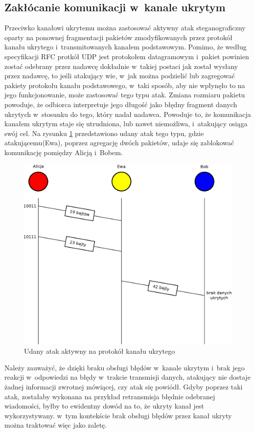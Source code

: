 \documentclass[a4paper, twoside, 12pt]{report}
\begin{document}
       \subsection{Zakłócanie komunikacji w~kanale ukrytym}
       Przeciwko kanałowi ukrytemu można zastosować aktywny atak steganograficzny
       oparty na ponownej fragmentacji pakietów zmodyfikowanych przez protokół
       kanału ukrytego i~transmitowanych kanałem podstawowym. Pomimo, że według
       specyfikacji RFC protkół UDP jest protokołem datagramowym i~pakiet powinien
       zostać odebrany przez nadawcę dokładnie w~takiej postaci jak został wysłany przez
       nadawcę, to jeśli atakujący wie, w~jak można podzielić lub zagregować
       pakiety protokołu kanału podstawowego, w~taki sposób, aby nie wpłynęło to na
       jego funkcjonowanie, może zastosować tego typu atak. Zmiana rozmiaru pakietu
       powoduje, że odbiorca interpretuje jego długość jako błędny fragment danych
       ukrytych w~stosunku do tego, który nadał nadawca. Powoduje to, że komunikacja
       kanałem ukrytym staje się utrudniona, lub nawet niemożliwa, i~atakujący osiąga
       swój cel. Na rysunku \ref{UDANYATAKAKTYWNY} przedstawiono udany atak tego typu,
       gdzie atakującemu(Ewa), poprzez agregację dwóch pakietów,
       udaje się zablokować komunikację pomiędzy Alicją i~Bobem.
        \begin{figure}[h]
                \centering
                \includegraphics[scale=0.7]{udany_atak}
                \caption{Udany atak aktywny na protokół kanału ukrytego}
                \label{UDANYATAKAKTYWNY}
        \end{figure}
       Należy zauważyć, że dzięki braku obsługi błędów w~kanale ukrytym
       i~brak jego reakcji w~odpowiedzi na błędy w~trakcie transmisji danych, atakujący
       nie dostaje żadnej informacji zwrotnej mówiącej, czy atak się powiódł. Gdyby
       poprzez taki atak, zostałaby wykonana na przykład retransmisja błędnie odebranej
       wiadomości, byłby to ewidentny dowód na to, że ukryty kanał jest wykorzystywany.
       w~tym kontekście brak obsługi błędów przez kanał ukryty można traktować więc
       jako zaletę.
\end{document}
